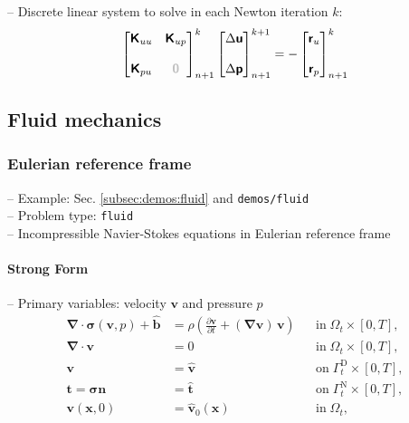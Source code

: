 \documentclass[a4paper,12pt]{report}
\newcommand{\bs}[1]{\boldsymbol{#1}}
\newcommand{\Om}{\mathit{\Omega}}
\newcommand{\Gm}{\mathit{\Gamma}}
\newcommand{\zerom}{\textcolor{lightgray}{\bs{\mathsf{0}}}}
\newcommand{\ROP}{\bs{\mathsf{r}}}
\begin{document}
-- Discrete linear system to solve in each Newton iteration $k$:
\begin{align}
\begin{bmatrix} \bs{\mathsf{K}}_{uu} & \bs{\mathsf{K}}_{up} \\ \\ \bs{\mathsf{K}}_{pu} & \zerom \end{bmatrix}_{n+1}^{k}\begin{bmatrix} \Delta\bs{\mathsf{u}} \\ \\ \Delta\bs{\mathsf{p}} \end{bmatrix}_{n+1}^{k+1}=-\begin{bmatrix} \ROP_{u} \\ \\ \ROP_{p} \end{bmatrix}_{n+1}^{k} \label{eq:lin_sys_solid_incomp}
\end{align}


\subsection{Fluid mechanics}\label{subsec:fluid}

\subsubsection{Eulerian reference frame}\label{subsubsec:fluid_eulerian}

-- Example: Sec. \ref{subsec:demos:fluid} and \verb"demos/fluid"\\

-- Problem type: \verb.fluid.\\

-- Incompressible Navier-Stokes equations in Eulerian reference frame\\

\paragraph{Strong Form}
-- Primary variables: velocity $\bs{v}$ and pressure $p$
\begin{align}
\bs{\nabla} \cdot \bs{\sigma}(\bs{v},p) + \hat{\bs{b}} &= \rho\left(\frac{\partial\bs{v}}{\partial t} + (\bs{\nabla}\bs{v})\,\bs{v}\right) &&\text{in} \; \mathit{\Om}_t \times [0, T], \label{eq:divsigma_ns} \\
\bs{\nabla}\cdot \bs{v} &= 0 &&\text{in} \; \mathit{\Om}_t \times [0, T],\label{eq:divv_ns}\\
\bs{v} &= \hat{\bs{v}} &&\text{on} \; \mathit{\Gm}_t^{\mathrm{D}} \times [0, T], \label{eq:bc_v_ns}\\
\bs{t} = \bs{\sigma}\bs{n} &= \hat{\bs{t}} &&\text{on} \; \mathit{\Gm}_t^{\mathrm{N}} \times [0, T], \label{eq:bc_N_ns}\\
\bs{v}(\bs{x},0) &= \hat{\bs{v}}_{0}(\bs{x}) &&\text{in} \; \mathit{\Om}_t, \label{eq:ini_v_ns}
\end{align}
\end{document}
